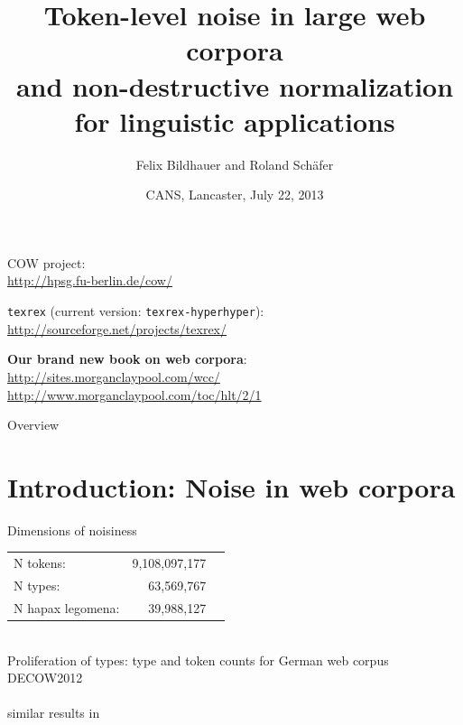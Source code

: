 \documentclass{beamer}
\title[Token-level noise and non-destructive normalization]{\Large Token-level noise in large web corpora\\
and non-destructive normalization\\
for linguistic applications}
\author[Felix Bildhauer, Roland Schäfer]{\Large Felix Bildhauer and Roland Schäfer}
\institute{SFB 632/A2, German Grammar and Linguistics (FU Berlin)}
\date{CANS, Lancaster, July 22, 2013}
\begin{document}
\fuberlintitlepage[12pt]

\begin{frame}
  \footnotesize
  \vspace{0.1cm}
  \begin{center}
    COW project:\\
    \alert{\url{http://hpsg.fu-berlin.de/cow/}}\\
    \vspace{0.3cm}

    \texttt{texrex} (current version: \texttt{texrex-hyperhyper}):\\
    \alert{\url{http://sourceforge.net/projects/texrex/}}
    \vspace{0.3cm}

    \textbf{Our brand new book on web corpora}:\\
    \alert{\url{http://sites.morganclaypool.com/wcc/}}\\
    \alert{\url{http://www.morganclaypool.com/toc/hlt/2/1}}
  \end{center}
\end{frame}

\begin{frame}
  {Overview}
       \footnotesize
       \tableofcontents[hideallsubsections]
\end{frame}

\section{Introduction: Noise in web corpora}

\begin{frame}
  {Dimensions of noisiness}
  \begin{center}
    \begin{tabular}{lrl}
      \hline
      N tokens:         & 9,108,097,177&\\
      N types:          & 63,569,767&\\
      N hapax legomena: & 39,988,127&\\
      \hline
    \end{tabular}\\

    \vspace{0.8cm}
    {\tiny Proliferation of types: type and token counts for German web corpus DECOW2012\\
      \cite{Schaefer-Bildhauer2012a,SchaeferBildhauer2013}\\
      similar results in \cite{LiuCurran2006}}
  \end{center}
\end{frame}
\end{document}
